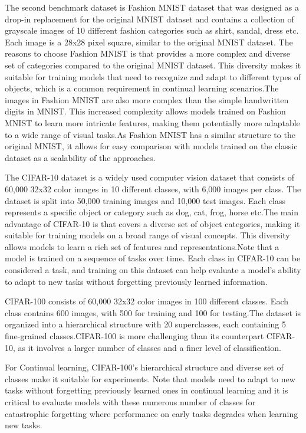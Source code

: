 \documentclass{article}
\begin{document}
The second benchmark dataset is Fashion MNIST dataset that was designed as a drop-in replacement for the original MNIST dataset and contains a collection of grayscale images of 10 different fashion categories such as shirt, sandal, dress etc. Each image is a 28x28 pixel square, similar to the original MNIST dataset.
The reasons to choose Fashion MNIST is that provides a more complex and diverse set of categories compared to the original MNIST dataset. This diversity makes it suitable for training models that need to recognize and adapt to different types of objects, which is a common requirement in continual learning scenarios.The images in Fashion MNIST are also more complex than the simple handwritten digits in MNIST. This increased complexity allows models trained on Fashion MNIST to learn more intricate features, making them potentially more adaptable to a wide range of visual tasks.As Fashion MNIST has a similar structure to the original MNIST, it allows for easy comparison with models trained on the classic dataset as a scalability of the approaches.

The CIFAR-10 dataset is a widely used computer vision dataset that consists of 60,000 32x32 color images in 10 different classes, with 6,000 images per class. The dataset is split into 50,000 training images and 10,000 test images. Each class represents a specific object or category such as dog, cat, frog, horse etc.The main advantage of CIFAR-10 is that covers a diverse set of object categories, making it suitable for training models on a broad range of visual concepts. This diversity allows models to learn a rich set of features and representations.Note that a model is trained on a sequence of tasks over time. Each class in CIFAR-10 can be considered a task, and training on this dataset can help evaluate a model's ability to adapt to new tasks without forgetting previously learned information.

CIFAR-100 consists of 60,000 32x32 color images in 100 different classes. Each class contains 600 images, with 500 for training and 100 for testing.The dataset is organized into a hierarchical structure with 20 superclasses, each containing 5 fine-grained classes.CIFAR-100 is more challenging than its counterpart CIFAR-10, as it involves a larger number of classes and a finer level of classification.

For Continual learning, CIFAR-100's hierarchical structure and diverse set of classes make it suitable for experiments. Note that models need to adapt to new tasks without forgetting previously learned ones in continual learning and it is critical  to evaluate models with these numerous number of classes for catastrophic forgetting where performance on early tasks degrades when learning new tasks.
\end{document}
